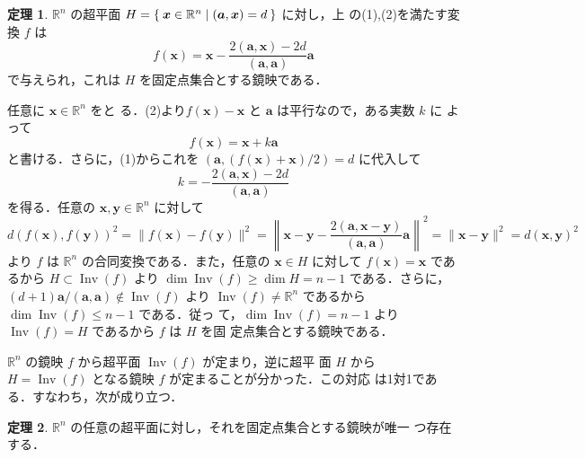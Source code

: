 \documentclass[11pt, uplatex, dvipdfmx, titlepage]{jsarticle}
\makeatletter
\DeclareMathOperator{\Inv}{Inv}
\renewenvironment{proof}[1][\proofname]{\par
  \pushQED{\qed}%
  \normalfont \topsep6\p@\@plus6\p@\relax
  \trivlist
  \item[\hskip\labelsep
         \bfseries
    {#1}]\ignorespaces
}{%
  \popQED\endtrivlist\@endpefalse
}
\theoremstyle{definition}
\newtheorem{theorem}{定理}[section]
\renewcommand{\proofname}{\textbf{証明}}
\makeatother
\begin{document}
\begin{theorem}\label{thm:ref-equation}
  $\mathbb{R}^n$ の超平面
  $H=\Set{\bm{x} \in \mathbb{R}^n | (\bm{a}, \bm{x})=d}$ に対し，上
  の(1),(2)を満たす変換 $f$ は
  \[
    f(\bm{x}) = \bm{x} - \frac{2(\bm{a}, \bm{x}) - 2d}{(\bm{a}, \bm{a})} \bm{a}
  \]
  で与えられ，これは $H$ を固定点集合とする鏡映である．
\end{theorem}
\begin{proof}
  任意に $\bm{x} \in \mathbb{R}^n$ をと
  る．(2)より$f(\bm{x})-\bm{x}$ と $\bm{a}$ は平行なので，ある実数 $k$ に
  よって
  \[
    f(\bm{x}) = \bm{x} + k \bm{a}
  \]
  と書ける．さらに，(1)からこれを $\left( \bm{a}, \left(f(\bm{x})+\bm{x}\right)/2\right)=d$ に代入して
  \[
    k = -\frac{2(\bm{a},\bm{x})-2d}{(\bm{a},\bm{a})}
  \]
  を得る．任意の $\bm{x},
  \bm{y} \in \mathbb{R}^n$ に対して
  \[
    d(f(\bm{x}), f(\bm{y}))^2 = \|f(\bm{x}) - f(\bm{y})\|^2
    = \left\|\bm{x} - \bm{y} - \frac{2\left(\bm{a}, \bm{x}-\bm{y}\right)}{(\bm{a}, \bm{a})} \bm{a}\right\|^2
    = \|\bm{x}-\bm{y}\|^2 = d(\bm{x}, \bm{y})^2
  \]
  より $f$ は $\mathbb{R}^n$ の合同変換である．また，任意の $\bm{x}
  \in H$ に対して $f(\bm{x}) = \bm{x}$ であるから $H \subset \Inv(f)$
  より $\dim \Inv(f) \geq \dim H = n-1$
  である．さらに，$(d+1)\bm{a}/(\bm{a}, \bm{a}) \notin \Inv(f)$ より $\Inv(f) \neq
  \mathbb{R}^n$ であるから $\dim \Inv(f) \leq n-1$ である．従っ
  て，$\dim\Inv(f) = n-1$ より $\Inv(f) = H$ であるから $f$ は $H$ を固
  定点集合とする鏡映である．
\end{proof}

$\mathbb{R}^n$ の鏡映 $f$ から超平面 $\Inv(f)$ が定まり，逆に超平
面 $H$ から $H=\Inv(f)$ となる鏡映 $f$ が定まることが分かった．この対応
は1対1である．すなわち，次が成り立つ．

\begin{theorem}\label{thm:ref-hyperplane}
  $\mathbb{R}^n$ の任意の超平面に対し，それを固定点集合とする鏡映が唯一
  つ存在する．
\end{theorem}
\end{document}
